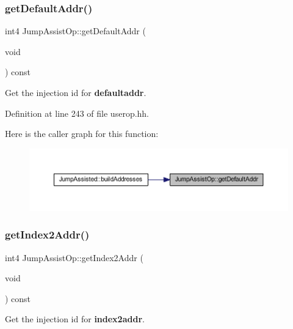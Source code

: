 \subsubsection{\texorpdfstring{getDefaultAddr()}{getDefaultAddr()}}
{\footnotesize\ttfamily int4 Jump\+Assist\+Op\+::get\+Default\+Addr (\begin{DoxyParamCaption}\item[{void}]{ }\end{DoxyParamCaption}) const\hspace{0.3cm}{\ttfamily [inline]}}



Get the injection id for {\bfseries{defaultaddr}}. 



Definition at line 243 of file userop.\+hh.

Here is the caller graph for this function\+:
\nopagebreak
\begin{figure}[H]
\begin{center}
\leavevmode
\includegraphics[width=350pt]{class_jump_assist_op_a23c4ab9487662316df6ae952522bbf3d_icgraph}
\end{center}
\end{figure}
\mbox{\label{class_jump_assist_op_ae4b341a772a139b06c20f52262d35adb}} 
\subsubsection{\texorpdfstring{getIndex2Addr()}{getIndex2Addr()}}
{\footnotesize\ttfamily int4 Jump\+Assist\+Op\+::get\+Index2\+Addr (\begin{DoxyParamCaption}\item[{void}]{ }\end{DoxyParamCaption}) const\hspace{0.3cm}{\ttfamily [inline]}}



Get the injection id for {\bfseries{index2addr}}. 



